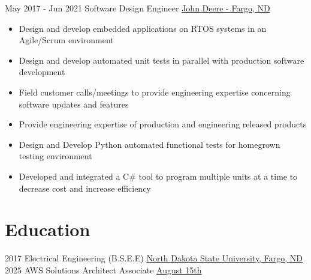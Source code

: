 \documentclass[letterpaper]{tenseconds} %
\begin{document}
\begin{twenty}
	\twentyitem
	{May 2017 -}
	{Jun 2021}
	{Software Design Engineer}
	{\href{https://www.deere.com/en/index.html}{John Deere - Fargo, ND}}
	{}
	{\begin{itemize}
		\item Design and develop embedded applications on RTOS systems in an Agile/Scrum environment
		\item Design and develop automated unit tests in parallel with production software development
		\item Field customer calls/meetings to provide engineering expertise concerning software updates and features
    \item Provide engineering expertise of production and engineering released products
    \item Design and Develop Python automated functional tests for homegrown testing environment
    \item Developed and integrated a C\# tool to program multiple units at a time to decrease cost and increase efficiency
		\end{itemize}}
\end{twenty}

\section{Education}
\begin{twenty} %
	\twentyitem
	{2017}
	{}
	{Electrical Engineering \textnormal{(B.S.E.E)}}
	{\href{https://www.ndsu.edu/}{North Dakota State University, Fargo, ND}}
	{}
	{}
	\twentyitem
	{2025}
	{}
  {AWS Solutions Architect Associate}
  {\href{https://aws.amazon.com/certification/certified-solutions-architect-associate/}{August 15th}}
	{}
	{}
\end{twenty}
\end{document}
